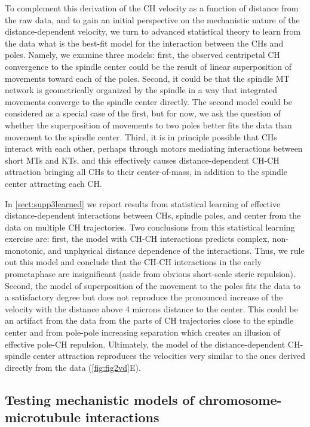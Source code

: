 \documentclass[times, twoside,onecolumn]{zHenriquesLab-StyleBioRxiv}
\begin{document}
To complement this derivation of the CH velocity as a function of distance from the raw data, and to gain an initial perspective on the mechanistic nature of the distance-dependent velocity, we turn to advanced statistical theory to learn from the data what is the best-fit model for the interaction between the CHs and poles.  Namely, we examine three models: first, the observed centripetal CH convergence to the spindle center could be the result of linear superposition of movements toward each of the poles. Second, it could be that the spindle MT network is geometrically organized by the spindle in a way that integrated movements converge to the spindle center directly. The second model could be considered as a special case of the first, but for now, we ask the question of whether the superposition of movements to two poles better fits the data than movement to the spindle center. Third, it is in principle possible that CHs interact with each other, perhaps through motors mediating interactions between short MTs and KTs, and this effectively causes distance-dependent CH-CH attraction bringing all CHs to their center-of-mass, in addition to the spindle center attracting each CH. 

In \cref{sect:supp3learned} we report results from statistical learning of effective distance-dependent interactions between CHs, spindle poles, and center from the data on multiple CH trajectories. Two conclusions from this statistical learning exercise are: first, the model with CH-CH interactions predicts complex, non-monotonic, and unphysical distance dependence of the interactions. Thus, we rule out this model and conclude that the CH-CH interactions in the early prometaphase are insignificant (aside from obvious short-scale steric repulsion). Second, the model of superposition of the movement to the poles fits the data to a satisfactory degree but does not reproduce the pronounced increase of the velocity with the distance above 4 microns distance to the center. This could be an artifact from the data from the parts of CH trajectories close to the spindle center and from pole-pole increasing separation which creates an illusion of effective pole-CH repulsion. Ultimately, the model of the distance-dependent CH-spindle center attraction reproduces the velocities very similar to the ones derived directly from the data (\cref{fig:fig2vd}E). 

\subsection*{Testing mechanistic models of chromosome-microtubule interactions} \mbox{}
\end{document}
